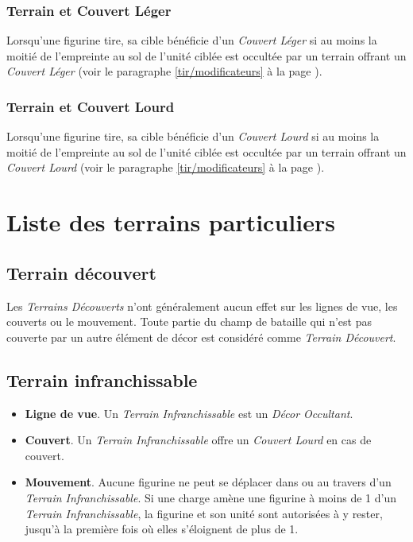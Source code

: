 \subsubsection*{Terrain et Couvert Léger}

Lorsqu'une figurine tire, sa cible bénéficie d'un \emph{Couvert Léger} si au moins la moitié de l'empreinte au sol de l'unité ciblée est occultée par un terrain offrant un \emph{Couvert Léger} (voir le paragraphe \ref{tir/modificateurs} à la page \pageref{tir/modificateurs}). 

\subsubsection*{Terrain et Couvert Lourd}

Lorsqu'une figurine tire, sa cible bénéficie d'un \emph{Couvert Lourd} si au moins la moitié de l'empreinte au sol de l'unité ciblée est occultée par un terrain offrant un \emph{Couvert Lourd} (voir le paragraphe \ref{tir/modificateurs} à la page \pageref{tir/modificateurs}). 

\section{Liste des terrains particuliers}

\subsection{Terrain découvert}

Les \emph{Terrains Découverts} n'ont généralement aucun effet sur les lignes de vue, les couverts ou le mouvement. Toute partie du champ de bataille qui n'est pas couverte par un autre élément de décor est considéré comme \emph{Terrain Découvert}.

\subsection{Terrain infranchissable}

\begin{itemize}[label={-}]
\item \textbf{Ligne de vue}. Un \emph{Terrain Infranchissable} est un \emph{Décor Occultant}.
\item \textbf{Couvert}. Un \emph{Terrain Infranchissable} offre un \emph{Couvert Lourd} en cas de couvert.
\item \textbf{Mouvement}. Aucune figurine ne peut se déplacer dans ou au travers d'un \emph{Terrain Infranchissable}. Si une charge amène une figurine à moins de 1{\pouce} d'un \emph{Terrain Infranchissable}, la figurine et son unité sont autorisées à y rester, jusqu'à la première fois où elles s'éloignent de plus de 1{\pouce}.
\end{itemize}

